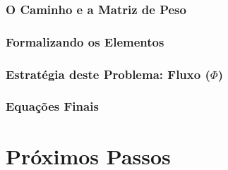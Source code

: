 \documentclass{beamer}
\begin{document}
\begin{frame}
	\frametitle{O Caminho e a Matriz de Peso}
	
	\begin{figure}[tbp]
		\centering
	\end{figure}
\end{frame}

\begin{frame}
	\frametitle{Formalizando os Elementos}
	
	\begin{figure}[tbp]
		\centering
	\end{figure}
\end{frame}


\begin{frame}
	\frametitle{Estratégia deste Problema: {\bf Fluxo} ($\Phi$)}
	
	\begin{figure}[tbp]
		\centering
	\end{figure}
\end{frame}


\begin{frame}
	\frametitle{Equações Finais}
	
	\begin{figure}[tbp]
		\centering
	\end{figure}
\end{frame}

\section{Próximos Passos}
\end{document}
